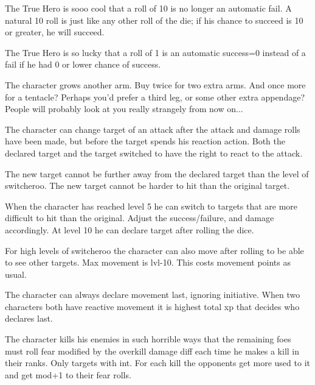 The True Hero is sooo cool that a roll of 10 is no longer an automatic fail. A natural 10 roll is just like any other roll of the die; if his chance to succeed is 10 or greater, he will succeed.


 The True Hero is so lucky that a roll of 1 is an automatic success=0 instead of a fail if he had 0 or lower chance of success.


 The character grows another arm. Buy twice for two extra arms. And once more for a tentacle? Perhaps you'd prefer a third leg, or some other extra appendage? People will probably look at you really strangely from now on...


 The character can change target of an attack after the attack and damage rolls have been made, but before the target spends his reaction action. Both the declared target and the target  switched to have the right to react to the attack.

The new target cannot be further away from the declared target than the level of switcheroo. The new target cannot be harder to hit than the original target.

When the character has reached level 5 he can switch to targets that are more difficult to hit than the original. Adjust the success/failure, and damage accordingly. At level 10 he can declare target after rolling the dice.

For high levels of switcheroo the character can also move after rolling to be able to see other targets. Max movement is lvl-10. This costs movement points as usual.


 The character can always declare movement last, ignoring initiative. When two characters both have reactive movement it is highest total xp that decides who declares last.


 The character kills his enemies in such horrible ways that the remaining foes must roll fear modified by the overkill damage diff each time he makes a kill in their ranks. Only targets with int. For each kill the opponents get more used to it and get mod+1 to their fear rolls.




